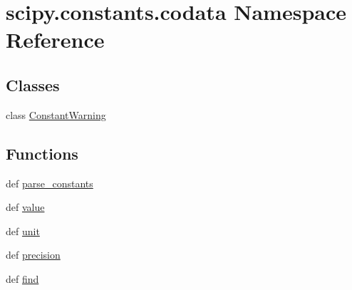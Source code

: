 \hypertarget{namespacescipy_1_1constants_1_1codata}{}\section{scipy.\+constants.\+codata Namespace Reference}
\label{namespacescipy_1_1constants_1_1codata}
\subsection*{Classes}
\begin{DoxyCompactItemize}
\item 
class \hyperlink{classscipy_1_1constants_1_1codata_1_1ConstantWarning}{Constant\+Warning}
\end{DoxyCompactItemize}
\subsection*{Functions}
\begin{DoxyCompactItemize}
\item 
def \hyperlink{namespacescipy_1_1constants_1_1codata_a8df8bd196ec6e0c92cdd03a0dc7ed88e}{parse\+\_\+constants}
\item 
def \hyperlink{namespacescipy_1_1constants_1_1codata_afca52bd411a99b9f442351e1ae94be8e}{value}
\item 
def \hyperlink{namespacescipy_1_1constants_1_1codata_a413f6e17d6979f60f0657993fa8a0865}{unit}
\item 
def \hyperlink{namespacescipy_1_1constants_1_1codata_a086d5450f350bd796fd6cbb48c9b52fb}{precision}
\item 
def \hyperlink{namespacescipy_1_1constants_1_1codata_a1de599528c526e369e919ee33ea5a0fc}{find}
\end{DoxyCompactItemize}
